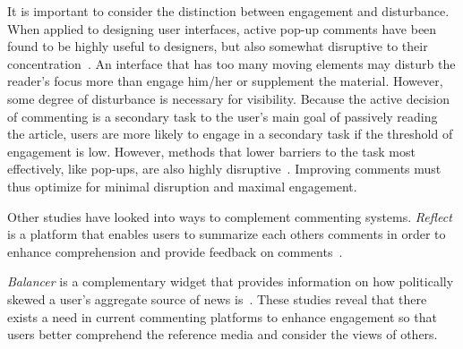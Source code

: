 It is important to consider the distinction between engagement and disturbance. When applied to designing user interfaces, active pop-up comments have been found to be highly useful to designers, but also somewhat disruptive to their concentration~\cite{CommentingSystems}. An interface that has too many moving elements may disturb the reader's focus more than engage him/her or supplement the material. However, some degree of disturbance is necessary for visibility. Because the active decision of commenting is a secondary task to the user's main goal of passively reading the article, users are more likely to engage in a secondary task if the threshold of engagement is low. However, methods that lower barriers to the task most effectively, like pop-ups, are also highly disruptive~\cite{Wikipedia}. Improving comments must thus optimize for minimal disruption and maximal engagement. %

Other studies have looked into ways to complement commenting systems. \textit{Reflect} is a platform that enables users to summarize each others comments in order to enhance comprehension and provide feedback on comments~\cite{Reflect}. 

\textit{Balancer} is a complementary widget that provides information on how politically skewed a user's aggregate source of news is~\cite{Politics}. These studies reveal that there exists a need in current commenting platforms to enhance engagement so that users better comprehend the reference media and consider the views of others.
